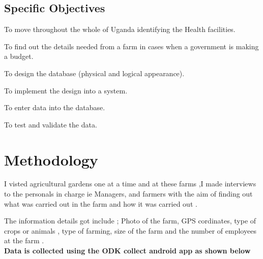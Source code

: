 \documentclass{article}
\begin{document}
\subsection{Specific Objectives}

To move throughout the whole of Uganda identifying the Health facilities.

To find out the details needed from a farm in cases when a government is making a budget.

To design the database (physical and logical appearance).

To implement the design into a system.

To enter data into the database.

To test and validate the data.

\section{Methodology}

I visted agricultural gardens one at a time and at these farms ,I made interviews to the personals in charge ie Managers, and farmers with the aim of finding out what was carried out in the farm and how it was carried out .

The information details got include ; Photo of the farm, GPS cordinates, type of crops or animals , type of farming, size of the farm and the number of employees at the farm .\\

{\bfseries Data is collected using the ODK collect android app as shown below }\\ \\
\end{document}
